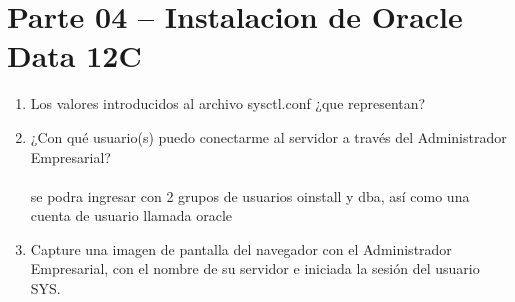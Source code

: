 \section{Parte 04 – Instalacion de Oracle Data 12C} 

\begin{enumerate}[1.]
	\item Los valores introducidos al archivo sysctl.conf ¿que representan?
	
	\item ¿Con qué usuario(s) puedo conectarme al servidor a través del Administrador Empresarial?
	\\
	\\ se podra ingresar con 2 grupos de usuarios oinstall y dba, así como una cuenta de usuario llamada oracle

	\item Capture una imagen de pantalla del navegador con el Administrador Empresarial, con el nombre de su servidor e iniciada la sesión del usuario SYS.

	

\end{enumerate} 
